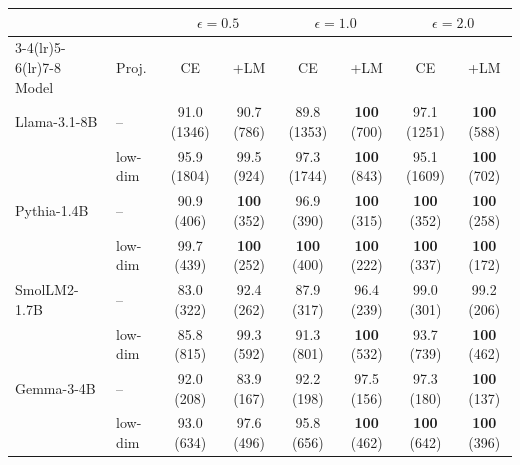 \begin{tabular}{l l cc cc cc}
\toprule
 & & \multicolumn{2}{c}{$\epsilon=0.5$} & \multicolumn{2}{c}{$\epsilon=1.0$} & \multicolumn{2}{c}{$\epsilon=2.0$} \\
\cmidrule(lr){3-4}\cmidrule(lr){5-6}\cmidrule(lr){7-8}
Model & Proj. & CE & +LM & CE & +LM & CE & +LM \\
\midrule
Llama-3.1-8B & -- & 91.0 {\scriptsize(1346)} & 90.7 {\scriptsize(786)} & 89.8 {\scriptsize(1353)} & \textbf{100} {\scriptsize(700)} & 97.1 {\scriptsize(1251)} & \textbf{100} {\scriptsize(588)} \\
 & low-dim & 95.9 {\scriptsize(1804)} & 99.5 {\scriptsize(924)} & 97.3 {\scriptsize(1744)} & \textbf{100} {\scriptsize(843)} & 95.1 {\scriptsize(1609)} & \textbf{100} {\scriptsize(702)} \\
\midrule
Pythia-1.4B & -- & 90.9 {\scriptsize(406)} & \textbf{100} {\scriptsize(352)} & 96.9 {\scriptsize(390)} & \textbf{100} {\scriptsize(315)} & \textbf{100} {\scriptsize(352)} & \textbf{100} {\scriptsize(258)} \\
 & low-dim & 99.7 {\scriptsize(439)} & \textbf{100} {\scriptsize(252)} & \textbf{100} {\scriptsize(400)} & \textbf{100} {\scriptsize(222)} & \textbf{100} {\scriptsize(337)} & \textbf{100} {\scriptsize(172)} \\
\midrule
SmolLM2-1.7B & -- & 83.0 {\scriptsize(322)} & 92.4 {\scriptsize(262)} & 87.9 {\scriptsize(317)} & 96.4 {\scriptsize(239)} & 99.0 {\scriptsize(301)} & 99.2 {\scriptsize(206)} \\
 & low-dim & 85.8 {\scriptsize(815)} & 99.3 {\scriptsize(592)} & 91.3 {\scriptsize(801)} & \textbf{100} {\scriptsize(532)} & 93.7 {\scriptsize(739)} & \textbf{100} {\scriptsize(462)} \\
\midrule
Gemma-3-4B & -- & 92.0 {\scriptsize(208)} & 83.9 {\scriptsize(167)} & 92.2 {\scriptsize(198)} & 97.5 {\scriptsize(156)} & 97.3 {\scriptsize(180)} & \textbf{100} {\scriptsize(137)} \\
 & low-dim & 93.0 {\scriptsize(634)} & 97.6 {\scriptsize(496)} & 95.8 {\scriptsize(656)} & \textbf{100} {\scriptsize(462)} & \textbf{100} {\scriptsize(642)} & \textbf{100} {\scriptsize(396)} \\
\bottomrule
\end{tabular}
